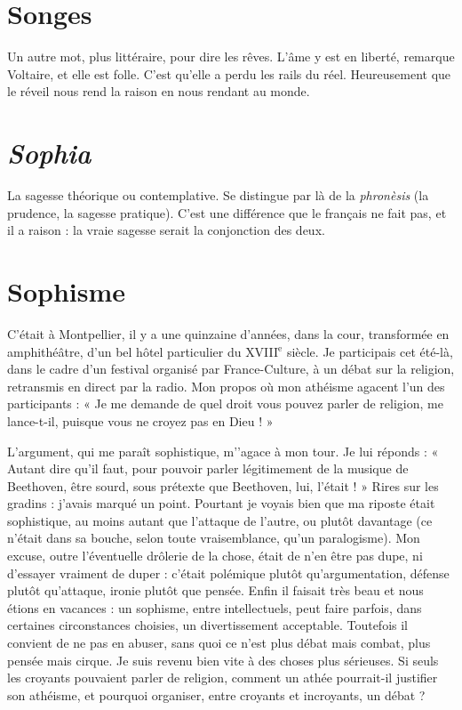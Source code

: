 \section{Songes}
Un autre mot, plus littéraire, pour dire les rêves. L'âme y est en
liberté, remarque Voltaire, et elle est folle. C’est qu’elle a perdu les
rails du réel. Heureusement que le réveil nous rend la raison en nous rendant
au monde.

\section{{\it Sophia}}
La sagesse théorique ou contemplative. Se distingue par là de la {\it phronèsis}
(la prudence, la sagesse pratique). C’est une différence que le
français ne fait pas, et il a raison : la vraie sagesse serait la conjonction des deux.

\section{Sophisme}
C'était à Montpellier, il y a une quinzaine d’années, dans la
cour, transformée en amphithéâtre, d’un bel hôtel particulier
du {\footnotesize XVIII$^\text{e}$} siècle. Je participais cet été-là, dans le cadre d’un festival organisé par
France-Culture, à un débat sur la religion, retransmis en direct par la radio.
Mon propos où mon athéisme agacent l’un des participants : « Je me demande
de quel droit vous pouvez parler de religion, me lance-t-il, puisque vous ne
croyez pas en Dieu ! »

L’argument, qui me paraît sophistique, m'’agace à mon tour. Je lui
réponds : « Autant dire qu’il faut, pour pouvoir parler légitimement de la
musique de Beethoven, être sourd, sous prétexte que Beethoven, lui, l’était ! »
Rires sur les gradins : j’avais marqué un point. Pourtant je voyais bien que ma
riposte était sophistique, au moins autant que l'attaque de l’autre, ou plutôt
davantage (ce n’était dans sa bouche, selon toute vraisemblance, qu’un paralogisme).
Mon excuse, outre l’éventuelle drôlerie de la chose, était de n’en être
pas dupe, ni d’essayer vraiment de duper : c'était polémique plutôt qu’argumentation,
défense plutôt qu’attaque, ironie plutôt que pensée. Enfin il faisait
très beau et nous étions en vacances : un sophisme, entre intellectuels, peut
faire parfois, dans certaines circonstances choisies, un divertissement acceptable.
Toutefois il convient de ne pas en abuser, sans quoi ce n’est plus débat
mais combat, plus pensée mais cirque. Je suis revenu bien vite à des choses plus
sérieuses. Si seuls les croyants pouvaient parler de religion, comment un athée
pourrait-il justifier son athéisme, et pourquoi organiser, entre croyants et
incroyants, un débat ?

